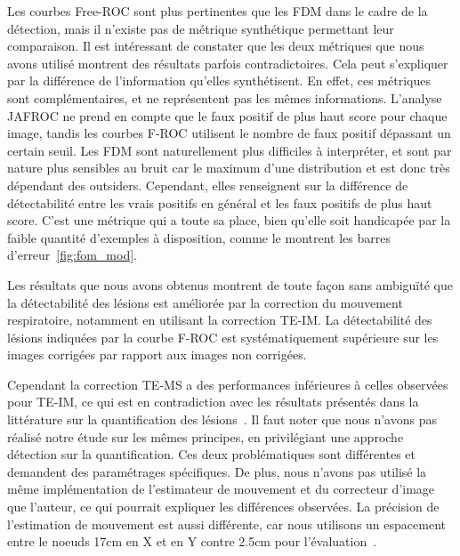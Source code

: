 Les courbes Free-ROC sont plus pertinentes que les FDM dans le cadre de la
détection, mais il n'existe pas de métrique synthétique permettant leur
comparaison. Il est intéressant de constater que les deux métriques que nous
avons utilisé montrent des résultats parfois contradictoires. Cela peut
s'expliquer par la différence de l'information qu'elles synthétisent. En effet,
ces métriques sont complémentaires, et ne représentent pas les mêmes
informations. L'analyse JAFROC
ne prend en compte que le faux positif de plus haut score pour chaque image,
tandis les courbes F-ROC utilisent le nombre de faux positif dépassant un
certain seuil. Les FDM sont naturellement plus difficiles à interpréter, et sont
par nature plus sensibles au bruit car le maximum d'une distribution et est
donc très dépendant des outsiders. Cependant, elles renseignent
sur la différence de détectabilité entre les vrais positifs en général et les
faux positifs de plus haut score. C’est une métrique qui a toute sa place, bien
qu’elle soit handicapée par la faible quantité d’exemples à disposition, comme
le montrent les barres d’erreur~\ref{fig:fom_mod}.



Les résultats que nous avons obtenus montrent de toute façon sans ambiguïté que
la détectabilité des lésions est améliorée par la correction du mouvement
respiratoire, notamment en utilisant la correction TE-IM. La détectabilité des
lésions indiquées par la courbe F-ROC est systématiquement supérieure sur les
images corrigées par rapport aux images non corrigées. 

Cependant la correction TE-MS a des performances inférieures à celles observées
pour TE-IM, ce qui est en contradiction avec les résultats présentés dans la
littérature sur la quantification des
lésions~\cite{lamare2007list,qiao2006motion}. Il faut noter que nous n'avons pas
réalisé notre
étude sur les mêmes principes, en privilégiant une approche détection sur la
quantification. Ces deux problématiques sont différentes et demandent des
paramétrages spécifiques. De plus, nous n'avons pas utilisé la même
implémentation de l'estimateur de mouvement et du correcteur d'image que
l'auteur, ce qui pourrait expliquer les différences observées. La précision de
l'estimation de mouvement est aussi différente, car nous utilisons un
espacement entre le noeuds 17cm en X et en Y contre 2.5cm pour
l'évaluation~\cite{lamare2007list}.


% 
% 
% 

